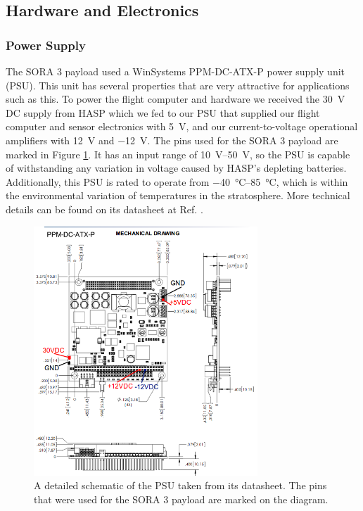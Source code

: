 \subsection{Hardware and Electronics}
\subsubsection{Power Supply}

The SORA 3 payload used a WinSystems PPM-DC-ATX-P power supply unit (PSU).
This unit has several properties that are very attractive for applications such as this. 
To power the flight computer and hardware we received the \SI{30}{\volt} DC supply from HASP which we fed to our PSU that supplied our flight computer and sensor electronics with \SI{+5}{\volt}, and our current-to-voltage operational amplifiers with \SI{+12}{\volt} and \SI{-12}{\volt}.
The pins used for the SORA 3 payload are marked in Figure \ref{fig:psu-outputs}.
It has an input range of \SIrange{10}{50}{\volt}, so the PSU is capable of withstanding any variation in voltage caused by HASP's depleting batteries.
Additionally, this PSU is rated to operate from \SIrange{-40}{85}{\celsius}, which is within the environmental variation of temperatures in the stratosphere.
More technical details can be found on its datasheet at Ref. \cite{WinSystems-PSU}.

\begin{figure}[h!]
	\begin{center}
		\includegraphics[width=0.75\textwidth]{figures/psu-pins.png}
		\caption{A detailed schematic of the PSU taken from its datasheet. The pins that were used for the SORA 3 payload are marked on the diagram.}
		\label{fig:psu-outputs}
	\end{center}
\end{figure}

